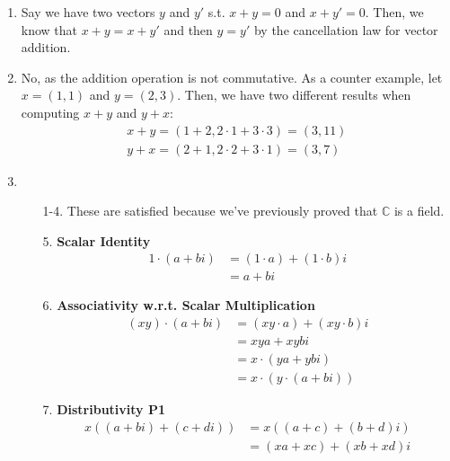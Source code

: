\documentclass[12pt]{article}
\begin{document}
\begin{enumerate}
      \item Say we have two vectors $y$ and $y'$ s.t. $x+y=0$ and $x+y'=0$.
            Then, we know that $x+y=x+y'$ and then $y=y'$ by the cancellation law for vector addition.
      \item No, as the addition operation is not commutative.
            As a counter example, let $x=(1,1)$ and $y=(2,3)$.
            Then, we have two different results when computing $x+y$ and $y+x$:
            \begin{gather*}
                  x+y=(1+2,2 \cdot 1 + 3 \cdot 3)=(3,11) \\
                  y+x=(2+1, 2 \cdot 2 + 3 \cdot 1)=(3,7)
            \end{gather*}
      \item \begin{itemize}
                  \item[1-4.] These are satisfied because we've previously proved that $\mathbb{C}$ is a field.
                  \item[5.] \textbf{Scalar Identity}
                        \begin{align*}
                              1 \cdot (a+bi) & =(1 \cdot a)+(1 \cdot b)i \\
                                             & =a+bi
                        \end{align*}
                  \item[6.] \textbf{Associativity w.r.t. Scalar Multiplication}
                        \begin{align*}
                              (xy)
                              \cdot (a+bi) & = (xy \cdot a)+(xy \cdot b)i \\
                                           & = xya+xybi                   \\
                                           & = x \cdot (ya+ybi)           \\
                                           & = x \cdot (y \cdot (a+bi))
                        \end{align*}
                  \item[7.] \textbf{Distributivity P1}
                        \begin{align*}
                              x((a+bi)+(c+di)) & = x((a+c)+(b+d)i)   \\
                                               & = (xa+xc)+(xb+xd)i  \\

\end{align*}
\end{itemize}
\end{enumerate}
\end{document}
